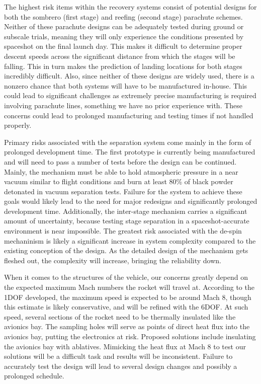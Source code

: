 The highest risk items within the recovery systems consist of potential designs for both the sombrero (first stage) and reefing (second stage) parachute schemes. Neither of these parachute designs can be adequately tested during ground or subscale trials, meaning they will only experience the conditions presented by spaceshot on the final launch day. This makes it difficult to determine proper descent speeds across the significant distance from which the stages will be falling. This in turn makes the prediction of landing locations for both stages incredibly difficult. Also, since neither of these designs are widely used, there is a nonzero chance that both systems will have to be manufactured in-house. This could lead to significant challenges as extremely precise manufacturing is required involving parachute lines, something we have no prior experience with. These concerns could lead to prolonged manufacturing and testing times if not handled properly.

Primary risks associated with the separation system come mainly in the form of prolonged development time. The first prototype is currently being manufactured and will need to pass a number of tests before the design can be continued. Mainly, the mechanism must be able to hold atmospheric pressure in a near vacuum similar to flight conditions and burn at least 80\% of black powder detonated in vacuum separation tests. Failure for the system to achieve these goals would likely lead to the need for major redesigns and significantly prolonged development time. Additionally, the inter-stage mechanism carries a significant amount of uncertainty, because testing stage separation in a spaceshot-accurate environment is near impossible. The greatest risk associated with the de-spin mechaninism is likely a significant increase in system complexity compared to the existing conception of the design. As the detailed design of the mechanism gets fleshed out, the complexity will increase, bringing the reliability down.

When it comes to the structures of the vehicle, our concerns greatly depend on the expected maximum Mach numbers the rocket will travel at. According to the 1DOF developed, the maximum speed is expected to be around Mach 8, though this estimate is likely conservative, and will be refined with the 6DOF. At such speed, several sections of the rocket need to be thermally insulated like the avionics bay. The sampling holes will serve as points of direct heat flux into the avionics bay, putting the electronics at risk. Proposed solutions include insulating the avionics bay with ablatives. Mimicking the heat flux at Mach 8 to test our solutions will be a difficult task and results will be inconsistent. Failure to accurately test the design will lead to several design changes and possibly a prolonged schedule.

